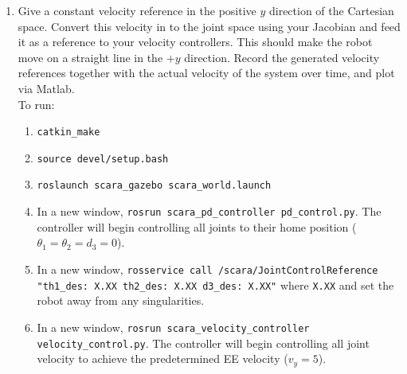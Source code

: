 \documentclass[10pt]{article}
\begin{document}
\begin{enumerate}
	\item Give a constant velocity reference in the positive $y$ direction of the Cartesian space. Convert this velocity in to the joint space using your Jacobian and feed it as a reference to your velocity controllers. This should make the robot move on a straight line in the $+y$ direction. Record the generated velocity references together with the actual velocity of the system over time, and plot via Matlab.
	\\
	
	To run:
	\begin{enumerate}
		\item \texttt{catkin\_make}
		\item \texttt{source devel/setup.bash}
		\item \texttt{roslaunch scara\_gazebo scara\_world.launch}
		\item In a new window, \texttt{rosrun scara\_pd\_controller pd\_control.py}. The controller will begin controlling all joints to their home position ($\theta_1 = \theta_2 = d_3 = 0$).
		\item In a new window, \texttt{rosservice call /scara/JointControlReference "th1\_des: X.XX th2\_des: X.XX d3\_des: X.XX"} where \texttt{X.XX} and set the robot away from any singularities.
		\item In a new window, \texttt{rosrun scara\_velocity\_controller velocity\_control.py}. The controller will begin controlling all joint velocity to achieve the predetermined EE velocity ($v_y = 5$).
	\end{enumerate}
\end{enumerate}
\end{document}
